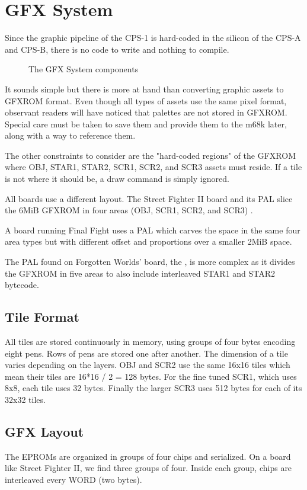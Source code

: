 \chapter{GFX System}
Since the graphic pipeline of the CPS-1 is hard-coded in the silicon of the CPS-A and CPS-B, there is no code to write and nothing to compile. 

\begin{figure}[H]
\caption*{The GFX System components}
\end{figure}

It sounds simple but there is more at hand than converting graphic assets to GFXROM format. Even though all types of assets use the same pixel format, observant readers will have noticed that palettes are not stored in GFXROM. Special care must be taken to save them and provide them to the m68k later, along with a way to reference them.

The other constraints to consider are the "hard-coded regions" of the GFXROM where OBJ, STAR1, STAR2, SCR1, SCR2, and SCR3 assets must reside. If a tile is not where it should be, a draw command is simply ignored.

All boards use a different layout. The Street Fighter II board and its  PAL slice the 6MiB GFXROM in four areas (OBJ, SCR1, SCR2, and SCR3) . 

A board running Final Fight uses a  PAL which carves the space in the same four area types but with different offset and proportions over a smaller 2MiB space. 

The PAL found on Forgotten Worlds' board, the , is more complex as it divides the GFXROM in five areas to also include interleaved STAR1 and STAR2 bytecode.


\section{Tile Format}
All tiles are stored continuously in memory, using groups of four bytes encoding eight pens. Rows of pens are stored one after another. The dimension of a tile varies depending on the layers. OBJ and SCR2 use the same 16x16 tiles which mean their tiles are 16*16 / 2 = 128 bytes. For the fine tuned SCR1, which uses 8x8, each tile uses 32 bytes. Finally the larger SCR3 uses 512 bytes for each of its 32x32 tiles.

\section{GFX Layout}
The EPROMs are organized in groups of four chips and serialized. On a board like Street Fighter II, we find three groups of four. Inside each group, chips are interleaved every WORD (two bytes).

